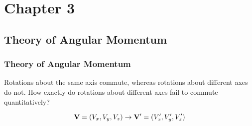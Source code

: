\section{Chapter 3}
\subsection{Theory of Angular Momentum}

\begin{frame}
	\frametitle{Theory of Angular Momentum}
Rotations about the same axis commute, whereas rotations about different axes do not.
How exactly do rotations about different axes fail to commute quantitatively?

\[
    \vb V = (V_x, V_y, V_z) \to \vb V' = (V_x', V_y', V_z')
\]

\end{frame}
